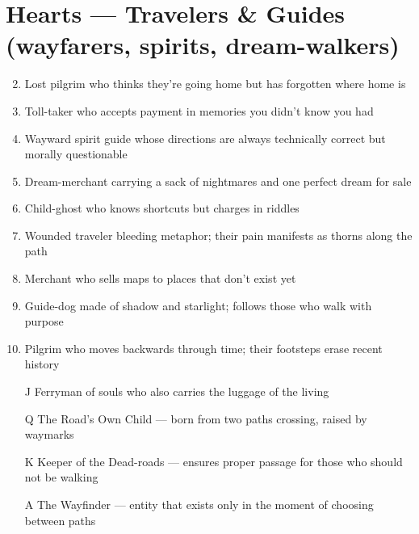 \section*{Hearts --- Travelers \& Guides (wayfarers, spirits, dream-walkers)}
\label{sec:ways-between-people}
\begin{enumerate}
\setcounter{enumi}{1}
\item Lost pilgrim who thinks they're going home but has forgotten where home is
\item Toll-taker who accepts payment in memories you didn't know you had
\item Wayward spirit guide whose directions are always technically correct but morally questionable
\item Dream-merchant carrying a sack of nightmares and one perfect dream for sale
\item Child-ghost who knows shortcuts but charges in riddles
\item Wounded traveler bleeding metaphor; their pain manifests as thorns along the path
\item Merchant who sells maps to places that don't exist yet
\item Guide-dog made of shadow and starlight; follows those who walk with purpose
\item Pilgrim who moves backwards through time; their footsteps erase recent history
\item[J] Ferryman of souls who also carries the luggage of the living
\item[Q] The Road's Own Child --- born from two paths crossing, raised by waymarks
\item[K] Keeper of the Dead-roads --- ensures proper passage for those who should not be walking
\item[A] The Wayfinder --- entity that exists only in the moment of choosing between paths
\end{enumerate}

